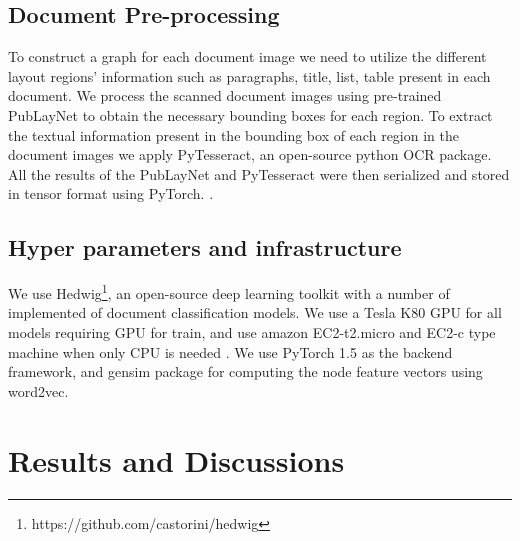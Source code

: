 \documentclass[letterpaper]{article}
\begin{document}
\subsection{Document Pre-processing}
To construct a graph for each document image we need to utilize the different layout regions' information such as paragraphs, title, list, table present in each document. We process the scanned document images using pre-trained PubLayNet to obtain the necessary bounding boxes for each region. To extract the textual information present in the bounding box of each region in the document images we apply PyTesseract, an open-source python OCR package. All the results of the PubLayNet and PyTesseract were then serialized and stored in tensor format using PyTorch. \cite{Pytorch}. 

\subsection{Hyper parameters and infrastructure}
We use Hedwig\footnote{https://github.com/castorini/hedwig},
an open-source deep learning
toolkit with a number of implemented of document classification models. 
We use a Tesla K80 GPU for all models requiring GPU for train, and use amazon EC2-t2.micro and EC2-c type machine when only CPU is needed . We use PyTorch 1.5 as the backend framework, and gensim \cite{gensim} package for computing the node feature vectors using word2vec.\\







%
 \section{Results and Discussions}
\end{document}
